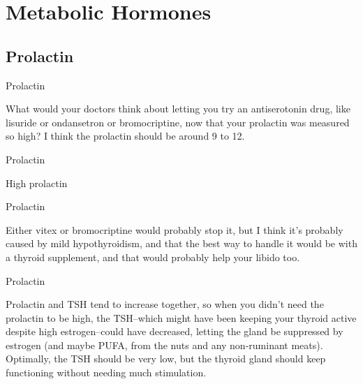 \documentclass[11pt,oneside,openany,extrafontsizes]{memoir}
\begin{document}
\section{Metabolic Hormones}
\subsection{Prolactin}

\begin{standalonequote}{Prolactin}

    \begin{answer}
        What would your doctors think about letting you try an antiserotonin drug, like lisuride or ondansetron or bromocriptine, now that your prolactin was measured so high? I think the prolactin should be around 9 to 12.
    \end{answer}
\end{standalonequote}

\begin{standalonequote}{Prolactin}

    \begin{answer}
        High prolactin
    \end{answer}
\end{standalonequote}

\begin{standalonequote}{Prolactin}

    \begin{answer}
        Either vitex or bromocriptine would probably stop it, but I think it's probably caused by mild hypothyroidism, and that the best way to handle it would be with a thyroid supplement, and that would probably help your libido too.
    \end{answer}
\end{standalonequote}

\begin{standalonequote}{Prolactin}

    \begin{answer}
        Prolactin and TSH tend to increase together, so when you didn't need the prolactin to be high, the TSH--which might have been keeping your thyroid active despite high estrogen--could have decreased, letting the gland be suppressed by estrogen (and maybe PUFA, from the nuts and any non-ruminant meats). Optimally, the TSH should be very low, but the thyroid gland should keep functioning without needing much stimulation.
    \end{answer}
\end{standalonequote}
\end{document}
